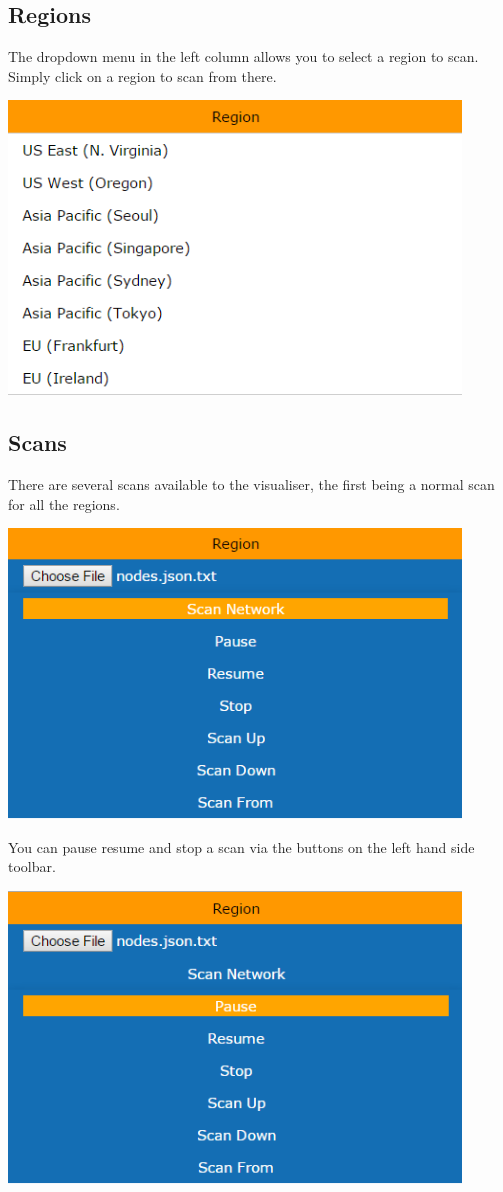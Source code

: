 \documentclass[hidelinks,a4paper,12pt]{article}
\begin{document}
	\subsection{Regions}
		The dropdown menu in the left column allows you to select a region to scan. Simply click on a region to scan from there. 
	
		\includegraphics[width=0.9\textwidth]{./images/Visualizer2.png}

	\subsection{Scans}
	There are several scans available to the visualiser, the first being a normal scan for all the regions. 
	
	\includegraphics[width=0.9\textwidth]{./images/Visualizer3.png}
	
	You can pause resume and stop a scan via the buttons on the left hand side toolbar. 
	
	\includegraphics[width=0.9\textwidth]{./images/Visualizer4.png}
	
\end{document}
